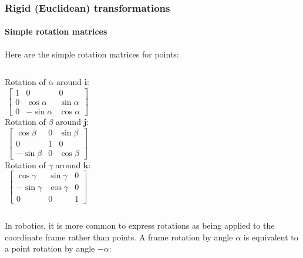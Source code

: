 \documentclass[aspectratio=169]{beamer}
\renewcommand{\vec}[1]{\boldsymbol{#1}}
\begin{document}
\begin{frame}
\frametitle{Rigid (Euclidean) transformations}
\framesubtitle{Simple rotation matrices}

Here are the simple rotation matrices for \alert{points}:

\medskip

\begin{columns}
\column{1.5in}
Rotation of $\alpha$ around $\vec{i}$:
\begin{equation*}
\begin{bmatrix}
1 & 0 & 0 \\
0 & \cos \alpha & \sin \alpha \\
0 & -\sin \alpha & \cos \alpha
\end{bmatrix}
\end{equation*}
\column{1.5in}
Rotation of $\beta$ around $\vec{j}$:
\begin{equation*}
\begin{bmatrix}
\cos \beta & 0 & \sin \beta \\
0 & 1 & 0 \\
-\sin \beta & 0 & \cos \beta
\end{bmatrix}
\end{equation*}
\column{1.5in}
Rotation of $\gamma$ around $\vec{k}$:
\begin{equation*}
\begin{bmatrix}
\cos \gamma & \sin \gamma & 0 \\
-\sin \gamma & \cos \gamma & 0 \\
0 & 0 & 1
\end{bmatrix}
\end{equation*}
\end{columns}

\medskip

In robotics, it is more common to express rotations as being applied to the
\alert{coordinate frame} rather than points. A frame rotation by angle
$\alpha$ is equivalent to a point rotation by angle $-\alpha$:

\medskip


\end{frame}
\end{document}
